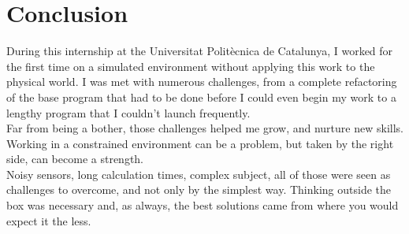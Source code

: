 \chapter{Conclusion}

\label{conclusion}

During this internship at the Universitat Politècnica de Catalunya, I worked for the first time on a simulated environment without applying this work to the physical world.
I was met with numerous challenges, from a complete refactoring of the base program that had to be done before I could even begin my work to a lengthy program that I couldn't launch frequently.\\

Far from being a bother, those challenges helped me grow, and nurture new skills. Working in a constrained environment can be a problem, but taken by the right side, can become a strength.\\

Noisy sensors, long calculation times, complex subject, all of those were seen as challenges to overcome, and not only by the simplest way.
Thinking outside the box was necessary and, as always, the best solutions came from where you would expect it the less.
